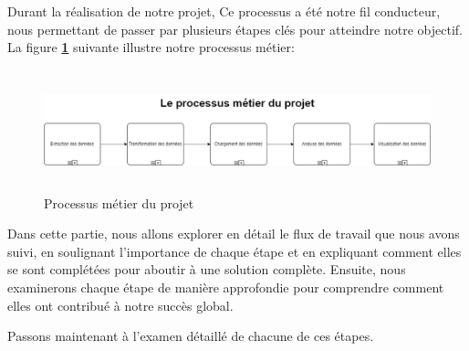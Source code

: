   \par Durant la réalisation de notre projet, Ce processus a été notre fil conducteur, nous permettant de passer par plusieurs étapes clés pour atteindre notre objectif.
  La figure \textbf{\ref{fig:BPMN}} suivante illustre notre processus métier:
        \begin{figure}[H]
        \centering
        \includegraphics[width =1\linewidth , height=3.5cm]{img/conception/BPMN.png}
        \caption{Processus métier du projet}
        \label{fig:BPMN}
        \end{figure}
  \par Dans cette partie, nous allons explorer en détail le flux de travail que nous avons suivi, en soulignant l'importance de chaque étape et en expliquant comment elles se sont complétées pour aboutir à une solution complète. Ensuite, nous examinerons chaque étape de manière approfondie pour comprendre comment elles ont contribué à notre succès global.
  \par Passons maintenant à l'examen détaillé de chacune de ces étapes.
